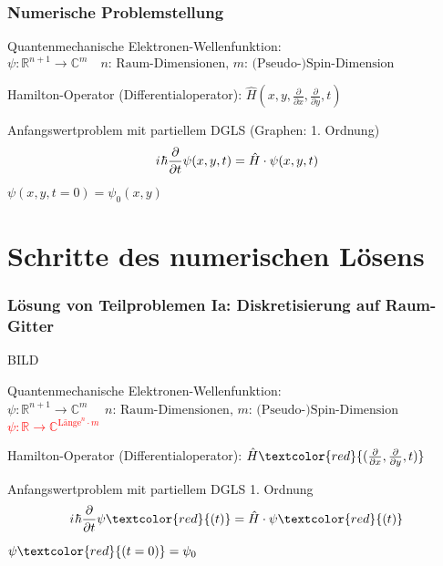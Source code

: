 \documentclass{beamer}
\newcommand{\iu}{{i\mkern1mu}} 	%
\newcommand{\absatz}{\vskip3mm}
\begin{document}
\begin{frame}[t] %
  \frametitle{Numerische Problemstellung}
 Quantenmechanische Elektronen-Wellenfunktion: \\
 $\psi: \mathbb{R}^{n+1} \rightarrow \mathbb{C}^m \quad \text{$n$: Raum-Dimensionen, $m$: (Pseudo-)Spin-Dimension}$

 \absatz
 Hamilton-Operator (Differentialoperator): $\hat{H}(x, y, \frac{\partial}{\partial x}, \frac{\partial}{\partial y}, t)$

 \begin{block}{Anfangswertproblem mit partiellem DGLS (Graphen: 1. Ordnung)}
  \begin{equation*}
    \iu \hbar \frac{\partial}{\partial t}  \psi(x, y, t) = \hat{H} \cdot \psi(x, y, t) 
  \end{equation*}

    $\psi(x, y, t=0) =\psi_0(x, y)$
    \end{block}
\end{frame}


\section{Schritte des numerischen Lösens}
\begin{frame}[t] %
  \frametitle{Lösung von Teilproblemen Ia: Diskretisierung auf Raum-Gitter}
  BILD
  
 Quantenmechanische Elektronen-Wellenfunktion: \\
 \sout{$\psi: \mathbb{R}^{n+1} \rightarrow \mathbb{C}^m$} $ \quad \text{$n$: Raum-Dimensionen, $m$: (Pseudo-)Spin-Dimension}$
 \\
\textcolor{red}{$\psi: \mathbb{R} \rightarrow \mathbb{C}^{\text{Länge}^n\cdot m} $}

 \absatz
 Hamilton-Operator (Differentialoperator): $\hat{H}\textcolor{red}{(\frac{\partial}{\partial x}, \frac{\partial}{\partial y}, t)}$

 \begin{block}{Anfangswertproblem mit partiellem DGLS 1. Ordnung}
  \begin{equation*}
    \iu \hbar \frac{\partial}{\partial t}  \psi\textcolor{red}{(t)} = \hat{H} \cdot \psi\textcolor{red}{(t)} 
  \end{equation*}

    $\psi\textcolor{red}{(t=0)} =\psi_0$
    \end{block}
\end{frame}
\end{document}

